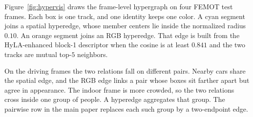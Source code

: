 \documentclass[10pt,twocolumn,letterpaper]{article}
\begin{document}
Figure~\ref{fig:hypervis} draws the frame-level hypergraph on four FEMOT test frames. Each box is one track, and one identity keeps one color. A cyan segment joins a spatial hyperedge, whose member centers lie inside the normalized radius $0.10$. An orange segment joins an RGB hyperedge. That edge is built from the HyLA-enhanced block-1 descriptor when the cosine is at least $0.841$ and the two tracks are mutual top-$5$ neighbors.

On the driving frames the two relations fall on different pairs. Nearby cars share the spatial edge, and the RGB edge links a pair whose boxes sit farther apart but agree in appearance. The indoor frame is more crowded, so the two relations cross inside one group of people. A hyperedge aggregates that group. The pairwise row in the main paper replaces each such group by a two-endpoint edge.

\FloatBarrier
\end{document}

